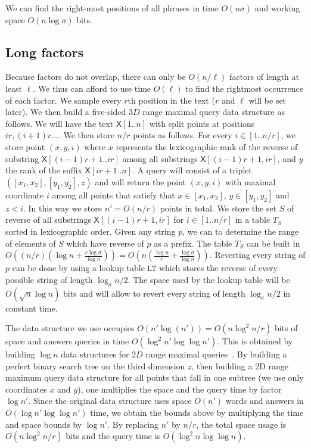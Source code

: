 \documentclass[11pt,runningheads]{llncs}
\def\X{\mathsf{X}}
\begin{document}
\begin{theorem}
We can find the right-most positions of all phrases in time $O(n\sigma)$
and working space $O(n\log\sigma)$ bits. 
\end{theorem}


\subsection{Long factors}
\label{sec:rightmost_long_factors}

Because factors do not overlap, there can only be $O(n/\ell)$ factors of length at least $\ell$.
We thus can afford to use time $O(\ell)$ to find the rightmost occurrence 
of each factor. We sample every $r$th position in the text
($r$ and $\ell$ will be set later). We then build a five-sided $3D$ range maximal query data structure
as follows. We will have the text $\X[1..n]$ with split points at positions 
$ir,(i+1)r\ldots $. We then store $n/r$ points as follows. 
For every $i\in[1..n/r]$, we store point $(x,y,i)$ where 
$x$ represents the lexicographic rank of the reverse of substring $\X[(i-1)r+1..ir]$
among all substrings $\X[(i-1)r+1,ir]$, and $y$ the rank of the suffix $\X[ir+1..n]$. A query will consist 
of a triplet $([x_1,x_2],[y_1,y_2],z)$ and will return the point
$(x,y,i)$ with maximal coordinate $i$ among all points that satisfy 
that $x\in[x_1,x_2]$, $y\in[y_1,y_2]$ and $z<i$. 
In this way we store $n'=O(n/r)$ points in total. 
We store the set $S$ of reverse of 
all substrings $\X[(i-1)r+1,ir]$ for $i\in[1..n/r]$ 
in a table $T_S$ sorted in lexicographic order. 
Given any string $p$, we can to determine the range of elements 
of $S$ which have reverse of $p$ as a prefix. The table $T_S$ 
can be built in $O((n/r)(\log n+\frac{r\log\sigma}{\log n}))=O(n(\frac{\log n}{r}+\frac{\log\sigma}{\log n}))$. 
Reverting every string of $p$ can be done by using a lookup table $\mathtt{LT}$ which stores
the reverse of every possible string of length $\log_\sigma n/2$. The space used 
by the lookup table will be $O(\sqrt{n}\log n)$ bits and will allow to revert 
every string of length $\log_\sigma n/2$ in constant time. 


The data structure we use occupies $O(n'\log (n'))=O(n\log^2 n/r)$
bits of space and answers queries in time $O(\log^2 n'\log \log n')$. 
This is obtained by building $\log n$ data structures 
for $2D$ range maximal queries~\cite{farzan2012succinct}. 
By building a perfect binary search tree on the third dimension 
$z$, then building a 2D range maximum query data structure for all points 
that fall in one subtree (we use only coordinates $x$ and $y$), one 
multiplies the space and the query time by factor $\log n'$. 
Since the original data structure uses space $O(n')$ words 
and answers in $O(\log n'\log\log n')$ time, 
we obtain the bounds above 
by multiplying the time and space bounds by $\log n'$. 
By replacing $n'$ by $n/r$, the total space usage is
$O(n\log^2n/r)$ bits and the query time is $O(\log^2n\log\log n)$. 
\end{document}
